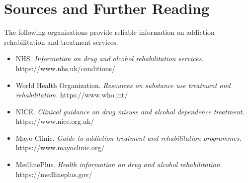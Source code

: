 \section*{Sources and Further Reading}
The following organisations provide reliable information on addiction rehabilitation and treatment services.

\begin{itemize}
    \item NHS. \textit{Information on drug and alcohol rehabilitation services.} https://www.nhs.uk/conditions/
    \item World Health Organization. \textit{Resources on substance use treatment and rehabilitation.} https://www.who.int/
    \item NICE. \textit{Clinical guidance on drug misuse and alcohol dependence treatment.} https://www.nice.org.uk/
    \item Mayo Clinic. \textit{Guide to addiction treatment and rehabilitation programmes.} https://www.mayoclinic.org/
    \item MedlinePlus. \textit{Health information on drug and alcohol rehabilitation.} https://medlineplus.gov/
\end{itemize}
